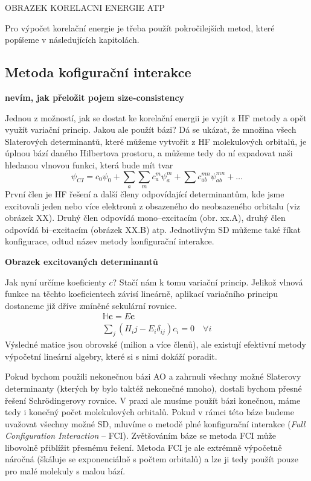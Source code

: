 OBRAZEK KORELACNI ENERGIE ATP


Pro výpočet korelační energie je třeba použít pokročilejších metod, které popíšeme v následujících kapitolách.

\subsection{Metoda kofigurační interakce}

\textbf{nevím, jak přeložit pojem size-consistency}

Jednou z možností, jak se dostat ke korelační energii je vyjít z HF metody a opět využít variační princip. Jakou ale použít bázi? Dá se ukázat, že množina všech Slaterových determinantů, které můžeme vytvořit z HF molekulových orbitalů, je úplnou bází daného Hilbertova prostoru, a můžeme tedy do ní expadovat naši hledanou vlnovou funkci, která bude mít tvar
\begin{equation}
\psi_{CI}=c_0\psi_0+\sum_a\sum_m c_a^m\psi_a^m+\sum c_{ab}^{mn}\psi_{ab}^{mn}+\dots
\label{rov:CIrozvoj}
\end{equation}
První člen je HF řešení a další členy odpovídající determinantům, kde jsme excitovali jeden nebo více elektronů z obsazeného do neobsazeného orbitalu (viz obrázek XX). Druhý člen odpovídá mono--excitacím (obr. xx.A), druhý člen odpovídá bi--excitacím (obrázek XX.B) atp. Jednotlivým SD můžeme také říkat konfigurace, odtud název metody konfigurační interakce.

\bigskip

\textbf{Obrazek excitovaných determinantů}

\bigskip

Jak nyní určíme koeficienty $c$? Stačí nám k tomu variační princip. Jelikož vlnová funkce na těchto koeficientech závisí lineárně, aplikací variačního principu dostaneme již dříve zmíněné sekulární rovnice.
\begin{eqnarray}
\mathbb{H}\mathbf{c}=E\mathbf{c} \nonumber \\
\sum_j (H_ij-E_i\delta_{ij})c_i=0 \quad \forall i
\end{eqnarray}
Výsledné matice jsou obrovské (milion a více členů), ale existují efektivní metody výpočetní lineární algebry, které si s nimi dokáží poradit.

Pokud bychom použili nekonečnou bázi AO a zahrnuli všechny možné Slaterovy determinanty (kterých by bylo taktéž nekonečné mnoho), dostali bychom přesné řešení Schr\"{o}dingerovy rovnice. V praxi ale musíme použít bázi konečnou, máme tedy i konečný počet molekulových orbitalů. Pokud v rámci této báze budeme uvažovat všechny možné SD, mluvíme o metodě plné konfigurační interakce (\textit{Full Configuration Interaction} -- FCI). Zvětšováním báze se metoda FCI může libovolně přiblížit přesnému řešení. Metoda FCI je ale extrémně výpočetně náročná (škáluje se exponenciálně s počtem orbitalů) a lze ji tedy použít pouze pro malé molekuly s malou bází.

